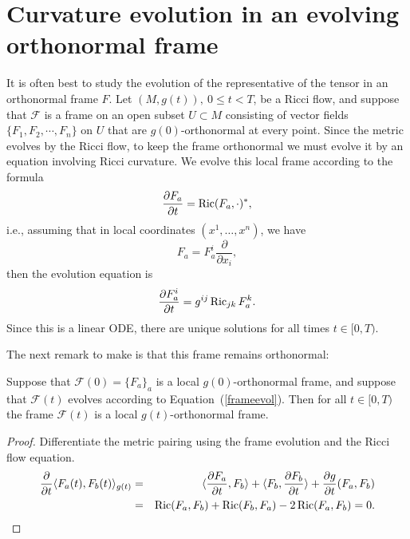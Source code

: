 \section{Curvature evolution in an evolving orthonormal
frame}\label{evolframe}


It is often best to study the evolution of the representative of the
tensor in an orthonormal frame $F$. Let $(M,g(t)),\ 0\le t<T$, be a
Ricci flow, and suppose that ${\mathcal F}$ is a frame on an open
subset $U\subset M$ consisting of vector fields $\{F_{1},
F_{2},\cdots,F_{n}\}$ on $U$ that are $g(0)$-orthonormal at every
point. Since the metric evolves by the Ricci flow, to keep the frame
orthonormal we must evolve it by an equation involving Ricci
curvature. We evolve this local frame  according to the formula
\begin{equation}\label{frameevol} \frac{\partial F_{a}}{\partial t}
= \operatorname{Ric}(F_{a},\cdot)^*,\end{equation} i.e.,  assuming that in local
coordinates $(x^1,\ldots,x^n)$, we have
\[ F_{a}=F^{i}_{a}\frac{\partial}{\partial x_{i}}, \]
then the evolution equation is
\[\frac{\partial F^{i}_{a}}{\partial t} = g^{ij}\operatorname{Ric}_{jk}F^{k}_{a}.\]
 Since this is a linear ODE, there are unique
solutions for all times $t\in [0,T)$.


The next remark to make is that this frame remains orthonormal:

\begin{claim}\label{claim:orthonormal-frame-preservation}
\label{ortho}



 Suppose that ${\mathcal F}(0)=\{F_a\}_a$ is a local  $g(0)$-orthonormal frame,
  and suppose that ${\mathcal F}(t)$ evolves according to Equation~(\ref{frameevol}). Then
 for all $t\in [0,T)$ the frame ${\mathcal F}(t)$ is a local $g(t)$-orthonormal frame.
\end{claim}

\begin{proof}
\sketch Differentiate the metric pairing using the frame evolution and
the Ricci flow equation.
\begin{eqnarray*}
\frac{\partial}{\partial t}\langle F_a(t),F_b(t)\rangle_{g(t)} & = & \langle
\frac{\partial F_a}{\partial t},F_b\rangle + \langle F_b,\frac{\partial
F_b}{\partial t}\rangle +
\frac {\partial g}{\partial t}(F_a,F_b) \\
 & = & \operatorname{Ric}(F_a,F_b)+\operatorname{Ric}(F_b,F_a)-2\operatorname{Ric}(F_a,F_b)=0.
\end{eqnarray*}
\end{proof}

